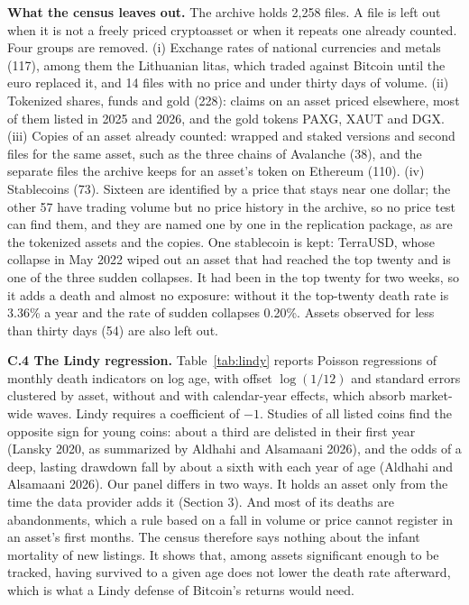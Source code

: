 \documentclass[11pt]{article}
\begin{document}
\textbf{What the census leaves out.} The archive holds 2,258 files. A file is left out when it is not a freely priced cryptoasset or when it repeats one already counted. Four groups are removed. (i) Exchange rates of national currencies and metals (117), among them the Lithuanian litas, which traded against Bitcoin until the euro replaced it, and 14 files with no price and under thirty days of volume. (ii) Tokenized shares, funds and gold (228): claims on an asset priced elsewhere, most of them listed in 2025 and 2026, and the gold tokens PAXG, XAUT and DGX. (iii) Copies of an asset already counted: wrapped and staked versions and second files for the same asset, such as the three chains of Avalanche (38), and the separate files the archive keeps for an asset's token on Ethereum (110). (iv) Stablecoins (73). Sixteen are identified by a price that stays near one dollar; the other 57 have trading volume but no price history in the archive, so no price test can find them, and they are named one by one in the replication package, as are the tokenized assets and the copies. One stablecoin is kept: TerraUSD, whose collapse in May 2022 wiped out an asset that had reached the top twenty and is one of the three sudden collapses. It had been in the top twenty for two weeks, so it adds a death and almost no exposure: without it the top-twenty death rate is 3.36\% a year and the rate of sudden collapses 0.20\%. Assets observed for less than thirty days (54) are also left out.

\textbf{C.4 The Lindy regression.} Table~\ref{tab:lindy} reports Poisson regressions of monthly death indicators on log age, with offset $\log(1/12)$ and standard errors clustered by asset, without and with calendar-year effects, which absorb market-wide waves. Lindy requires a coefficient of $-1$. Studies of all listed coins find the opposite sign for young coins: about a third are delisted in their first year (Lansky 2020, as summarized by Aldhahi and Alsamaani 2026), and the odds of a deep, lasting drawdown fall by about a sixth with each year of age (Aldhahi and Alsamaani 2026). Our panel differs in two ways. It holds an asset only from the time the data provider adds it (Section 3). And most of its deaths are abandonments, which a rule based on a fall in volume or price cannot register in an asset's first months. The census therefore says nothing about the infant mortality of new listings. It shows that, among assets significant enough to be tracked, having survived to a given age does not lower the death rate afterward, which is what a Lindy defense of Bitcoin's returns would need.
\end{document}
